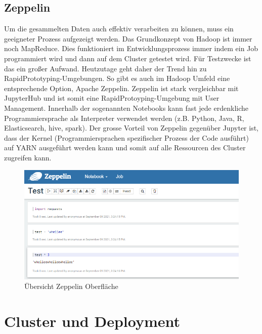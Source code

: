 \documentclass[12pt,oneside,a4paper,parskip]{scrbook}
\begin{document}
\section{Zeppelin}
Um die gesammelten Daten auch effektiv verarbeiten zu k\"onnen, muss ein geeigneter Prozess aufgezeigt werden. Das Grundkonzept von Hadoop ist immer noch MapReduce. Dies funktioniert im Entwicklungsprozess immer indem ein Job programmiert wird und dann auf dem Cluster getestet wird. F\"ur Testzwecke ist das ein großer Aufwand. Heutzutage geht daher  der Trend hin zu RapidPrototyping-Umgebungen. So gibt es auch im Hadoop Umfeld eine entsprechende Option, Apache Zeppelin. Zeppelin ist stark vergleichbar mit JupyterHub und ist somit eine RapidProtoyping-Umgebung mit User Management. Innerhalb der sogenannten Notebooks kann fast jede erdenkliche Programmiersprache als Interpreter verwendet werden (z.B. Python, Java, R, Elasticsearch, hive, spark). Der grosse Vorteil von Zeppelin gegen\"uber Jupyter ist, dass der Kernel (Programmiersprachen spezifischer Prozess der Code ausf\"uhrt) auf YARN ausgef\"uhrt werden kann und somit auf alle Ressourcen des Cluster zugreifen kann.
\begin{figure}[H]
	\centering
	\includegraphics[scale=0.6]{zeppelinOverview.png}
	\captionsetup{justification=centering}
	\caption{\"Ubersicht Zeppelin Oberfl\"ache}
	\label{pic:zeppelinOverview}
\end{figure}

\chapter{Cluster und Deployment}
\end{document}
